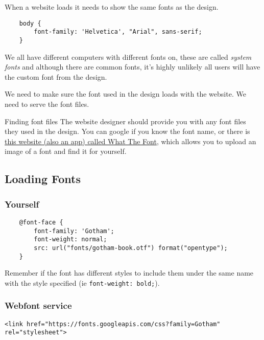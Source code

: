 When a website loads it needs to show the same fonts as the design.

\begin{verbatim}
    body {
	    font-family: 'Helvetica', "Arial", sans-serif;
    }
\end{verbatim}

We all have different computers with different fonts on, these are called \textit{system fonts} and although there are common fonts, it's highly unlikely all users will have the custom font from the design.

We need to make sure the font used in the design loads with the website. We need to serve the font files.

\begin{infobox}{Finding font files}
    The website designer should provide you with any font files they used in the design. You can google if you know the font name, or there is \href{https://www.myfonts.com/WhatTheFont}{this website (also an app) called What The Font}, which allows you to upload an image of a font and find it for yourself.
\end{infobox}

\subsection{Loading Fonts}

\subsubsection{Yourself}

\begin{verbatim}
    @font-face {
	    font-family: 'Gotham';
        font-weight: normal;
        src: url("fonts/gotham-book.otf") format("opentype");
    }
\end{verbatim}

Remember if the font has different styles to include them under the same name with the style specified (ie \texttt{font-weight: bold;}).

\subsubsection{Webfont service}

\begin{verbatim}
<link href="https://fonts.googleapis.com/css?family=Gotham" rel="stylesheet">
\end{verbatim}

